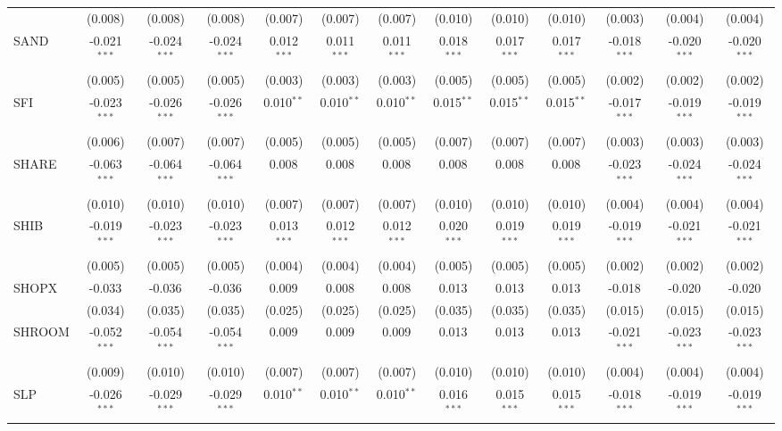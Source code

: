 \begin{table}[!htbp]
\begin{tabular}{@{\extracolsep{5pt}}lcccccccccccc}
  & (0.008) & (0.008) & (0.008) & (0.007) & (0.007) & (0.007) & (0.010) & (0.010) & (0.010) & (0.003) & (0.004) & (0.004) \\
 SAND & -0.021$^{***}$ & -0.024$^{***}$ & -0.024$^{***}$ & 0.012$^{***}$ & 0.011$^{***}$ & 0.011$^{***}$ & 0.018$^{***}$ & 0.017$^{***}$ & 0.017$^{***}$ & -0.018$^{***}$ & -0.020$^{***}$ & -0.020$^{***}$ \\
  & (0.005) & (0.005) & (0.005) & (0.003) & (0.003) & (0.003) & (0.005) & (0.005) & (0.005) & (0.002) & (0.002) & (0.002) \\
 SFI & -0.023$^{***}$ & -0.026$^{***}$ & -0.026$^{***}$ & 0.010$^{**}$ & 0.010$^{**}$ & 0.010$^{**}$ & 0.015$^{**}$ & 0.015$^{**}$ & 0.015$^{**}$ & -0.017$^{***}$ & -0.019$^{***}$ & -0.019$^{***}$ \\
  & (0.006) & (0.007) & (0.007) & (0.005) & (0.005) & (0.005) & (0.007) & (0.007) & (0.007) & (0.003) & (0.003) & (0.003) \\
 SHARE & -0.063$^{***}$ & -0.064$^{***}$ & -0.064$^{***}$ & 0.008$^{}$ & 0.008$^{}$ & 0.008$^{}$ & 0.008$^{}$ & 0.008$^{}$ & 0.008$^{}$ & -0.023$^{***}$ & -0.024$^{***}$ & -0.024$^{***}$ \\
  & (0.010) & (0.010) & (0.010) & (0.007) & (0.007) & (0.007) & (0.010) & (0.010) & (0.010) & (0.004) & (0.004) & (0.004) \\
 SHIB & -0.019$^{***}$ & -0.023$^{***}$ & -0.023$^{***}$ & 0.013$^{***}$ & 0.012$^{***}$ & 0.012$^{***}$ & 0.020$^{***}$ & 0.019$^{***}$ & 0.019$^{***}$ & -0.019$^{***}$ & -0.021$^{***}$ & -0.021$^{***}$ \\
  & (0.005) & (0.005) & (0.005) & (0.004) & (0.004) & (0.004) & (0.005) & (0.005) & (0.005) & (0.002) & (0.002) & (0.002) \\
 SHOPX & -0.033$^{}$ & -0.036$^{}$ & -0.036$^{}$ & 0.009$^{}$ & 0.008$^{}$ & 0.008$^{}$ & 0.013$^{}$ & 0.013$^{}$ & 0.013$^{}$ & -0.018$^{}$ & -0.020$^{}$ & -0.020$^{}$ \\
  & (0.034) & (0.035) & (0.035) & (0.025) & (0.025) & (0.025) & (0.035) & (0.035) & (0.035) & (0.015) & (0.015) & (0.015) \\
 SHROOM & -0.052$^{***}$ & -0.054$^{***}$ & -0.054$^{***}$ & 0.009$^{}$ & 0.009$^{}$ & 0.009$^{}$ & 0.013$^{}$ & 0.013$^{}$ & 0.013$^{}$ & -0.021$^{***}$ & -0.023$^{***}$ & -0.023$^{***}$ \\
  & (0.009) & (0.010) & (0.010) & (0.007) & (0.007) & (0.007) & (0.010) & (0.010) & (0.010) & (0.004) & (0.004) & (0.004) \\
 SLP & -0.026$^{***}$ & -0.029$^{***}$ & -0.029$^{***}$ & 0.010$^{**}$ & 0.010$^{**}$ & 0.010$^{**}$ & 0.016$^{***}$ & 0.015$^{***}$ & 0.015$^{***}$ & -0.018$^{***}$ & -0.019$^{***}$ & -0.019$^{***}$ \\

\end{tabular}
\end{table}
